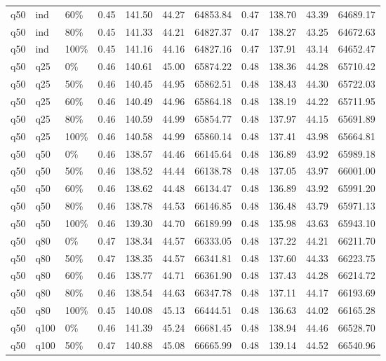 \begin{longtable}{lllrrrrrrrr}
  q50 & ind & 60\% & 0.45 & 141.50 & 44.27 & 64853.84 & 0.47 & 138.70 & 43.39 & 64689.17 \\ 
  q50 & ind & 80\% & 0.45 & 141.33 & 44.21 & 64827.37 & 0.47 & 138.27 & 43.25 & 64672.63 \\ 
  q50 & ind & 100\% & 0.45 & 141.16 & 44.16 & 64827.16 & 0.47 & 137.91 & 43.14 & 64652.47 \\ 
  q50 & q25 & 0\% & 0.46 & 140.61 & 45.00 & 65874.22 & 0.48 & 138.36 & 44.28 & 65710.42 \\ 
  q50 & q25 & 50\% & 0.46 & 140.45 & 44.95 & 65862.51 & 0.48 & 138.43 & 44.30 & 65722.03 \\ 
  q50 & q25 & 60\% & 0.46 & 140.49 & 44.96 & 65864.18 & 0.48 & 138.19 & 44.22 & 65711.95 \\ 
  q50 & q25 & 80\% & 0.46 & 140.59 & 44.99 & 65854.77 & 0.48 & 137.97 & 44.15 & 65691.89 \\ 
  q50 & q25 & 100\% & 0.46 & 140.58 & 44.99 & 65860.14 & 0.48 & 137.41 & 43.98 & 65664.81 \\ 
  q50 & q50 & 0\% & 0.46 & 138.57 & 44.46 & 66145.64 & 0.48 & 136.89 & 43.92 & 65989.18 \\ 
  q50 & q50 & 50\% & 0.46 & 138.52 & 44.44 & 66138.78 & 0.48 & 137.05 & 43.97 & 66001.00 \\ 
  q50 & q50 & 60\% & 0.46 & 138.62 & 44.48 & 66134.47 & 0.48 & 136.89 & 43.92 & 65991.20 \\ 
  q50 & q50 & 80\% & 0.46 & 138.78 & 44.53 & 66146.85 & 0.48 & 136.48 & 43.79 & 65971.13 \\ 
  q50 & q50 & 100\% & 0.46 & 139.30 & 44.70 & 66189.99 & 0.48 & 135.98 & 43.63 & 65943.10 \\ 
  q50 & q80 & 0\% & 0.47 & 138.34 & 44.57 & 66333.05 & 0.48 & 137.22 & 44.21 & 66211.70 \\ 
  q50 & q80 & 50\% & 0.47 & 138.35 & 44.57 & 66341.81 & 0.48 & 137.60 & 44.33 & 66223.75 \\ 
  q50 & q80 & 60\% & 0.46 & 138.77 & 44.71 & 66361.90 & 0.48 & 137.43 & 44.28 & 66214.72 \\ 
  q50 & q80 & 80\% & 0.46 & 138.54 & 44.63 & 66347.78 & 0.48 & 137.11 & 44.17 & 66193.69 \\ 
  q50 & q80 & 100\% & 0.45 & 140.08 & 45.13 & 66444.51 & 0.48 & 136.63 & 44.02 & 66165.28 \\ 
  q50 & q100 & 0\% & 0.46 & 141.39 & 45.24 & 66681.45 & 0.48 & 138.94 & 44.46 & 66528.70 \\ 
  q50 & q100 & 50\% & 0.47 & 140.88 & 45.08 & 66665.99 & 0.48 & 139.14 & 44.52 & 66540.96 \\ 

\end{longtable}
